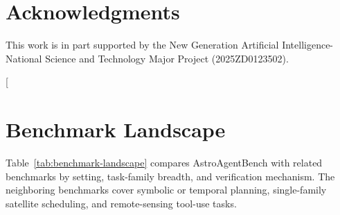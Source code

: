 \documentclass[11pt]{article}
\begin{document}
\section*{Acknowledgments}

This work is in part supported by the New Generation Artificial Intelligence-National Science and Technology Major Project (2025ZD0123502).



\clearpage
\appendix
\ifdefined\nolinenumbers\nolinenumbers\fi
\raggedbottom

\twocolumn[
\section{Benchmark Landscape}
\label{app:benchmark-landscape}

Table~\ref{tab:benchmark-landscape} compares AstroAgentBench with related benchmarks by setting, task-family breadth, and verification mechanism. The neighboring benchmarks cover symbolic or temporal planning, single-family satellite scheduling, and remote-sensing tool-use tasks.
\end{document}
